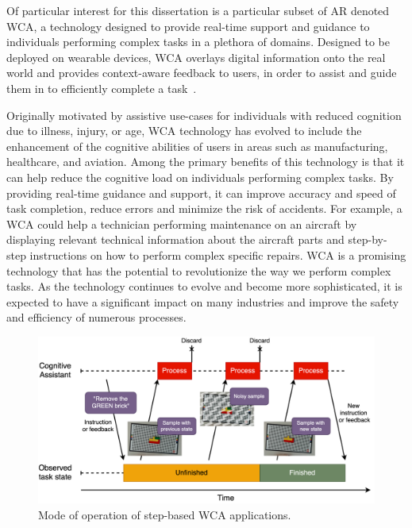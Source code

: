 Of particular interest for this dissertation is a particular subset of \gls{AR} denoted \acf{WCA}, a technology designed to provide real-time support and guidance to individuals performing complex tasks in a plethora of domains.
Designed to be deployed on wearable devices, \gls{WCA} overlays digital information onto the real world and provides context-aware feedback to users, in order to assist and guide them in to efficiently complete a task~\cite{ha2014towards,chen2015early,chen2018application,wang2020scaling}.

Originally motivated by assistive use-cases for individuals with reduced cognition due to illness, injury, or age, \gls{WCA} technology has evolved to include the enhancement of the cognitive abilities of users in areas such as manufacturing, healthcare, and aviation.
Among the primary benefits of this technology is that it can help reduce the cognitive load on individuals performing complex tasks.
By providing real-time guidance and support, it can improve accuracy and speed of task completion, reduce errors and minimize the risk of accidents.
For example, a \gls{WCA} could help a technician performing maintenance on an aircraft by displaying relevant technical information about the aircraft parts and step-by-step instructions on how to perform complex specific repairs.
\gls{WCA} is a promising technology that has the potential to revolutionize the way we perform complex tasks.
As the technology continues to evolve and become more sophisticated, it is expected to have a significant impact on many industries and improve the safety and efficiency of numerous processes.

\medskip

\begin{figure}
    \centering
    \includegraphics[width=.9\textwidth]{figures/wca_state}
    \caption{Mode of operation of step-based \acs{WCA} applications.}\label{fig:wca:operation}
\end{figure}

